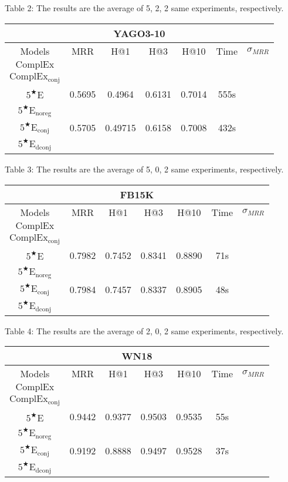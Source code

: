 \documentclass[9pt]{ctexart}
\theoremstyle{definition}
\begin{document}
\begin{center}
Table 2: The results are the average of 5, 2, 2 same experiments, respectively.

\bigskip

\begin{tabular}{ccccccc}
    \toprule
    \multicolumn{7}{c}{YAGO3-10}\\
    \hline
    Models & MRR & H@1 & H@3 & H@10 & Time & $\sigma_{MRR}$\\
    \midrule
    $\mathrm{ComplEx}$\\
    $\mathrm{ComplEx_{conj}}$\\
    $5^{\bigstar}\mathrm{E}$ & 0.5695 & 0.4964 & 0.6131 & 0.7014 & 555s\\
    $5^{\bigstar}\mathrm{E_{noreg}}$ & \\
    $5^{\bigstar}\mathrm{E_{conj}}$ & 0.5705 &0.49715 & 0.6158 & 0.7008 & 432s\\
    $5^{\bigstar}\mathrm{E_{dconj}}$ &&&&&&\\
    \bottomrule
\end{tabular}

Table 3: The results are the average of 5, 0, 2 same experiments, respectively.

\bigskip

\begin{tabular}{ccccccc}
    \toprule
    \multicolumn{7}{c}{FB15K}\\
    \hline
    Models & MRR & H@1 & H@3 & H@10 & Time & $\sigma_{MRR}$\\
    \midrule
    $\mathrm{ComplEx}$\\
    $\mathrm{ComplEx_{conj}}$\\
    $5^{\bigstar}\mathrm{E}$ & 0.7982 & 0.7452 & 0.8341 & 0.8890 & 71s\\
    $5^{\bigstar}\mathrm{E_{noreg}}$ & \\
    $5^{\bigstar}\mathrm{E_{conj}}$ & 0.7984 & 0.7457 & 0.8337 & 0.8905 & 48s\\
    $5^{\bigstar}\mathrm{E_{dconj}}$ &&&&&&\\
    \bottomrule
\end{tabular}

Table 4: The results are the average of 2, 0, 2 same experiments, respectively.

\bigskip

\begin{tabular}{ccccccc}
    \toprule
    \multicolumn{7}{c}{WN18}\\
    \hline
    Models & MRR & H@1 & H@3 & H@10 & Time & $\sigma_{MRR}$\\
    \midrule
    $\mathrm{ComplEx}$\\
    $\mathrm{ComplEx_{conj}}$\\
    $5^{\bigstar}\mathrm{E}$ & 0.9442 & 0.9377 & 0.9503 & 0.9535 & 55s\\
    $5^{\bigstar}\mathrm{E_{noreg}}$ & \\
    $5^{\bigstar}\mathrm{E_{conj}}$ & 0.9192 & 0.8888 & 0.9497 & 0.9528 & 37s\\
    $5^{\bigstar}\mathrm{E_{dconj}}$ &&&&&&\\
    \bottomrule
\end{tabular}


\end{center}
\end{document}
